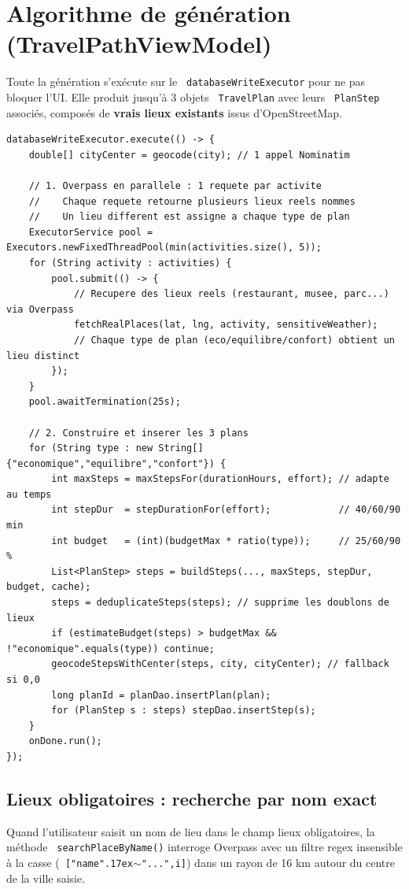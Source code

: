 \documentclass[a4paper,12pt,openany]{report}
\newcommand{\ic}[1]{\texttt{\small\colorbox{lightbg}{\color{navy!90} #1}}}
\begin{document}
\section{Algorithme de génération (TravelPathViewModel)}

Toute la génération s'exécute sur le \ic{databaseWriteExecutor} pour ne pas
bloquer l'UI. Elle produit jusqu'à 3 objets \ic{TravelPlan} avec leurs
\ic{PlanStep} associés, composés de \textbf{vrais lieux existants} issus
d'OpenStreetMap.

\begin{lstlisting}
databaseWriteExecutor.execute(() -> {
    double[] cityCenter = geocode(city); // 1 appel Nominatim

    // 1. Overpass en parallele : 1 requete par activite
    //    Chaque requete retourne plusieurs lieux reels nommes
    //    Un lieu different est assigne a chaque type de plan
    ExecutorService pool = Executors.newFixedThreadPool(min(activities.size(), 5));
    for (String activity : activities) {
        pool.submit(() -> {
            // Recupere des lieux reels (restaurant, musee, parc...) via Overpass
            fetchRealPlaces(lat, lng, activity, sensitiveWeather);
            // Chaque type de plan (eco/equilibre/confort) obtient un lieu distinct
        });
    }
    pool.awaitTermination(25s);

    // 2. Construire et inserer les 3 plans
    for (String type : new String[]{"economique","equilibre","confort"}) {
        int maxSteps = maxStepsFor(durationHours, effort); // adapte au temps
        int stepDur  = stepDurationFor(effort);            // 40/60/90 min
        int budget   = (int)(budgetMax * ratio(type));     // 25/60/90 %
        List<PlanStep> steps = buildSteps(..., maxSteps, stepDur, budget, cache);
        steps = deduplicateSteps(steps); // supprime les doublons de lieux
        if (estimateBudget(steps) > budgetMax && !"economique".equals(type)) continue;
        geocodeStepsWithCenter(steps, city, cityCenter); // fallback si 0,0
        long planId = planDao.insertPlan(plan);
        for (PlanStep s : steps) stepDao.insertStep(s);
    }
    onDone.run();
});
\end{lstlisting}

\subsection{Lieux obligatoires : recherche par nom exact}

Quand l'utilisateur saisit un nom de lieu dans le champ lieux obligatoires,
la méthode \ic{searchPlaceByName()} interroge Overpass avec un filtre regex
insensible à la casse (\ic{["name"{\raise.17ex\hbox{$\scriptstyle\sim$}}"...",i]}) dans un rayon de 16 km
autour du centre de la ville saisie.
\end{document}
